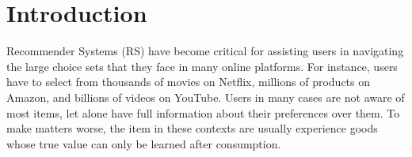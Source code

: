 \documentclass[format=acmsmall, review=false]{acmart}
\title[\PaperTitle]{\PaperTitle}
\begin{document}
\maketitle


\section{Introduction}

Recommender Systems (RS) have become critical for assisting users in navigating the large choice sets that they face in many online platforms. For instance, users have to select from thousands of movies on Netflix, millions of products on Amazon, and billions of videos on YouTube. Users in many cases are not aware of most items, let alone have full information about their preferences over them. To make matters worse, the item in these contexts are usually experience goods whose true value can only be learned after consumption.
\par
\end{document}
